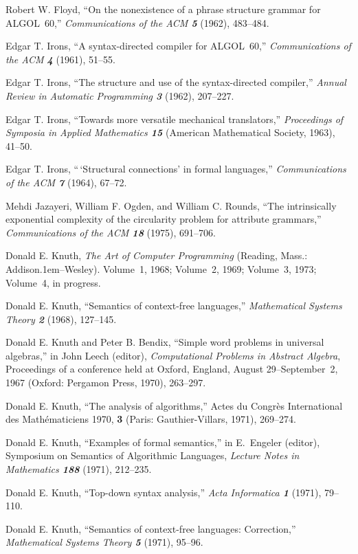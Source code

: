 \bib
[8] Robert W. Floyd, ``On the nonexistence of a phrase structure
grammar for 
{\ninerm ALGOL}~60,'' {\sl Communications of the ACM\/ \bf 5}
(1962), 483--484.

\bib
[9] Edgar T. Irons, ``A syntax-directed compiler for 
{\ninerm ALGOL}~60,'' 
{\sl Communications of the ACM\/ \bf 4} (1961), 51--55.

\bib
[10] Edgar T. Irons, ``The structure and use of the
syntax-directed compiler,'' {\sl Annual Review in Automatic
Programming\/ \bf 3} (1962), 207--227.

\bib
[11] Edgar T. Irons, ``Towards more versatile mechanical
translators,''
{\sl Proceedings of Symposia in Applied Mathematics\/ \bf 15}
(American Mathematical Society, 1963), 41--50.

\bib
[12] Edgar T. Irons, ``$\,$`Structural connections' in formal
languages,'' {\sl Communications of the ACM\/ \bf 7} (1964), 67--72.

\bib
[13] Mehdi Jazayeri, William F. Ogden, and William C. Rounds, ``The
intrinsically exponential complexity of the circularity problem for
attribute grammars,'' {\sl Communications of the ACM\/ \bf 18} (1975),
691--706. 

\bib
[14] Donald E. Knuth, {\sl The Art of Computer Programming\/}
(Reading, Mass.: Addi\-son\kern.1em--Wesley). Volume~1, 1968; 
Volume~2, 1969;
Volume~3, 1973; Volume~4, in progress.

\bib
[15] Donald E. Knuth, ``Semantics of context-free languages,''
{\sl Mathematical Systems Theory\/ \bf 2} (1968), 127--145.

\bib
[16] Donald E. Knuth and Peter B. Bendix, ``Simple word problems in
universal algebras,'' in John Leech (editor), {\sl Computational
Problems in Abstract Algebra}, Proceedings of a conference held at
Oxford, England, August 29--September~2, 1967 (Oxford: Pergamon Press,
1970), 263--297.

\bib
[17] Donald E. Knuth, ``The analysis of algorithms,'' Actes du
Congr\`es International des Math\'ematiciens 1970, {\bf 3} (Paris:
Gauthier-Villars, 1971), 269--274.

\bib
[18] Donald E. Knuth, ``Examples of formal semantics,'' in
E.~Engeler (editor), Symposium on Semantics of Algorithmic Languages,
{\sl Lecture Notes in Mathematics\/ \bf 188} (1971), 212--235.

\bib
[19] Donald E. Knuth, ``Top-down syntax analysis,'' {\sl Acta
Informatica\/ \bf 1} (1971), 79--110.

\bib
[20] Donald E. Knuth, ``Semantics of context-free languages:
Correction,'' {\sl Mathematical Systems Theory\/ \bf 5} (1971),
95--96.

